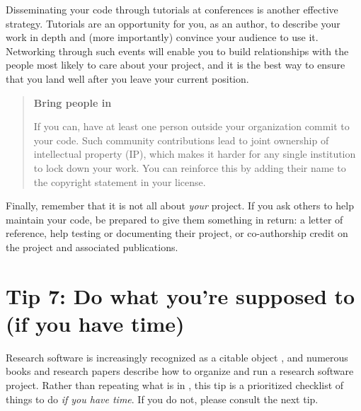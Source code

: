 \documentclass[10pt,letterpaper]{article}
\begin{document}
Disseminating your code through tutorials at conferences is another effective strategy.
Tutorials are an opportunity for you, as an author, to describe your work in depth and (more importantly) convince your audience to use it.
Networking through such events will enable you to build relationships with the people most likely to care about your project, and it is the best way to ensure that you land well after you leave your current position.

\begin{quote}
  \noindent
  \textbf{Bring people in}

  If you can, have at least one person outside your organization commit to your code.
  Such community contributions lead to joint ownership of intellectual property (IP),
  which makes it harder for any single institution to lock down your work.
  You can reinforce this by adding their name to the copyright statement in your license.
\end{quote}

Finally, remember that it is not all about \emph{your} project.
If you ask others to help maintain your code, be prepared to give them something in return: a letter of reference, help testing or documenting their project, or co-authorship credit on the project and associated publications.

\section*{Tip 7: Do what you're supposed to (if you have time)}

Research software is increasingly recognized as a citable object \cite{Smith2016, Katz2021, Garijo2024}, and numerous books and research papers describe how to organize and run a research software project.
Rather than repeating what is in \cite{Sandve2013,Wilson2014,Lee2018a,Dryden2019,Akhmerov2020,Chue2021,Lees2022,Druskat2023,Akhmerov2023,Kumar2023,Struck2023,Reina2024}, this tip is a prioritized checklist of things to do \emph{if you have time}.
If you do not, please consult the next tip.
\end{document}
